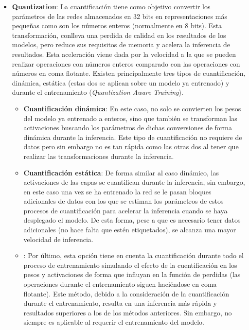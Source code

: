 \begin{itemize}
\begin{itemize}
    \end{itemize}
    \item \textbf{Quantization}: La cuantificación tiene como objetivo convertir los parámetros de las redes almacenados en 32 bits en representaciones más pequeñas como son los números enteros (normalmente en 8 bits). Esta transformación, conlleva una perdida de calidad en los resultados de los modelos, pero reduce sus requisitos de memoria y acelera la inferencia de resultados. Esta aceleración viene dada por la velocidad a la que se pueden realizar operaciones con números enteros comparado con las operaciones con números en coma flotante. Existen principalmente tres tipos de cuantificación, dinámica, estática (estas dos se aplican sobre un modelo ya entrenado) y durante el entrenamiento (\textit{Quantization Aware Training}).
    \begin{itemize}
        \item \textbf{Cuantificación dinámica}: En este caso, no solo se convierten los pesos del modelo ya entrenado a enteros, sino que también se transforman las activaciones buscando los parámetros de dichas conversiones de forma dinámica durante la inferencia. Este tipo de cuantificación no requiere de datos pero sin embargo no es tan rápida como las otras dos al tener que realizar las transformaciones durante la inferencia.
        \item \textbf{Cuantificación estática}: De forma similar al caso dinámico, las activaciones de las capas se cuantifican durante la inferencia, sin embargo, en este caso una vez se ha entrenado la red se le pasan bloques adicionales de datos con los que se estiman los parámetros de estos procesos de cuantificación para acelerar la inferencia cuando se haya desplegado el modelo. De esta forma, pese a que es necesario tener datos adicionales (no hace falta que estén etiquetados), se alcanza una mayor velocidad de inferencia.
        \item {}: Por último, esta opción tiene en cuenta la cuantificación durante todo el proceso de entrenamiento simulando el efecto de la cuentificación en los pesos y activaciones de forma que influyan en la función de perdidas (las operaciones durante el entrenamiento siguen haciéndose en coma flotante). Este método, debido a la consideración de la cuantificación durante el entrenamiento, resulta en una inferencia más rápida y resultados superiores a los de los métodos anteriores. Sin embargo, no siempre es aplicable al requerir el entrenamiento del modelo.

\end{itemize}
\end{itemize}

